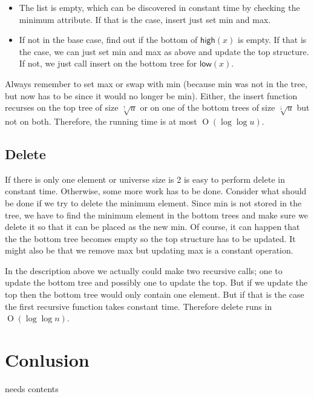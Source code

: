 \documentclass[oneside,11pt,openright]{report}
\newcommand{\BigO}[1]{\ensuremath{\operatorname{O}\left(#1\right)}}
\newcommand{\HIGH}{\textsf{high}}
\newcommand{\LOW}{\textsf{low}}
\newcommand{\HIGHER}{\sqrt[\uparrow]{u}}
\newcommand{\LOWER}{\sqrt[\downarrow]{u}}
\begin{document}
\begin{itemize}
\item The list is empty, which can be discovered in constant time by checking the minimum attribute. If that is the case, insert just set min and max.
\item If not in the base case, find out if the bottom of $\HIGH(x)$ is empty. If that is the case, we can just set min and max as above and update the top structure. If not, we just call insert on the bottom tree for $\LOW(x)$.
\end{itemize}

Always remember to set max or swap with min (because min was not in the tree, but now has to be since it would no longer be min). Either, the insert function recurses on the top tree of size $\HIGHER$ or on one of the bottom trees of size $\LOWER$ but not on both. Therefore, the running time is at most $\BigO{\log \log u}$.

\section{Delete}

If there is only one element or universe size is 2 is easy to perform delete in constant time. Otherwise, some more work has to be done. Consider what should be done if we try to delete the minimum element. Since min is not stored in the tree, we have to find the minimum element in the bottom trees and make sure we delete it so that it can be placed as the new min. Of course, it can happen that the the bottom tree becomes empty so the top structure has to be updated. It might also be that we remove max but updating max is a constant operation.

In the description above we actually could make two recursive calls; one to update the bottom tree and possibly one to update the top. But if we update the top then the bottom tree would only contain one element. But if that is the case the first recursive function takes constant time. Therefore delete runs in $\BigO{\log \log n}$.

\chapter{Conlusion}

needs contents



 

\end{document}
